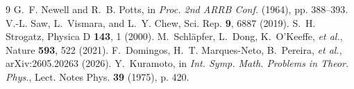 \documentclass[9pt,twocolumn,twoside]{opticajnl}
\begin{document}
\begin{thebibliography}{9}
 G.~F. Newell and R.~B. Potts, in \emph{Proc. 2nd ARRB Conf.} (1964), pp. 388--393.
 V.-L. Saw, L.~Vismara, and L.~Y. Chew, Sci. Rep. \textbf{9}, 6887 (2019).
 S.~H. Strogatz, Physica D \textbf{143}, 1 (2000).
 M.~Schl\"apfer, L.~Dong, K.~O'Keeffe, \emph{et al.}, Nature \textbf{593}, 522 (2021).
 F.~Domingos, H.~T. Marques-Neto, B.~Pereira, \emph{et al.}, arXiv:2605.20263 (2026).
 Y.~Kuramoto, in \emph{Int. Symp. Math. Problems in Theor. Phys.}, Lect. Notes Phys. \textbf{39} (1975), p. 420.
\end{thebibliography}
\end{document}
